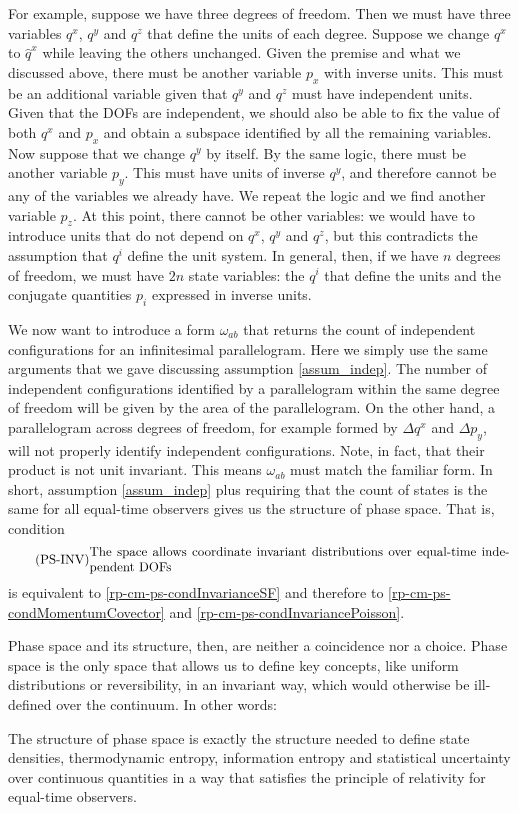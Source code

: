 For example, suppose we have three degrees of freedom. Then we must have three variables $q^x$, $q^y$ and $q^z$ that define the units of each degree. Suppose we change $q^x$ to $\hat{q}^x$ while leaving the others unchanged. Given the premise and what we discussed above, there must be another variable $p_x$ with inverse units. This must be an additional variable given that $q^y$ and $q^z$ must have independent units. Given that the DOFs are independent, we should also be able to fix the value of both $q^x$ and $p_x$ and obtain a subspace identified by all the remaining variables. Now suppose that we change $q^y$ by itself. By the same logic, there must be another variable $p_y$. This must have units of inverse $q^y$, and therefore cannot be any of the variables we already have. We repeat the logic and we find another variable $p_z$. At this point, there cannot be other variables: we would have to introduce units that do not depend on $q^x$, $q^y$ and $q^z$, but this contradicts the assumption that $q^i$ define the unit system. In general, then, if we have $n$ degrees of freedom, we must have $2n$ state variables: the $q^i$ that define the units and the conjugate quantities $p_i$ expressed in inverse units.

We now want to introduce a form $\omega_{ab}$ that returns the count of independent configurations for an infinitesimal parallelogram. Here we simply use the same arguments that we gave discussing assumption \ref{assum_indep}. The number of independent configurations identified by a parallelogram within the same degree of freedom will be given by the area of the parallelogram. On the other hand, a parallelogram across degrees of freedom, for example formed by $\Delta q^x$ and $\Delta p_y$, will not properly identify independent configurations. Note, in fact, that their product is not unit invariant. This means $\omega_{ab}$ must match the familiar form. In short, assumption \ref{assum_indep} plus requiring that the count of states is the same for all equal-time observers gives us the structure of phase space. That is, condition
\begin{equation}\tag{PS-INV}\label{rp-cm-ps-condInvariantDensity}
	\eqtext{The space allows coordinate invariant distributions over equal-time  independent DOFs}
\end{equation}
is equivalent to \ref{rp-cm-ps-condInvarianceSF} and therefore to \ref{rp-cm-ps-condMomentumCovector} and \ref{rp-cm-ps-condInvariancePoisson}.

Phase space and its structure, then, are neither a coincidence nor a choice. Phase space is the only space that allows us to define key concepts, like uniform distributions or reversibility, in an invariant way, which would otherwise be ill-defined over the continuum. In other words:
\begin{insight}
	The structure of phase space is exactly the structure needed to define state densities, thermodynamic entropy, information entropy and statistical uncertainty over continuous quantities in a way that satisfies the principle of relativity for equal-time observers.
\end{insight}

